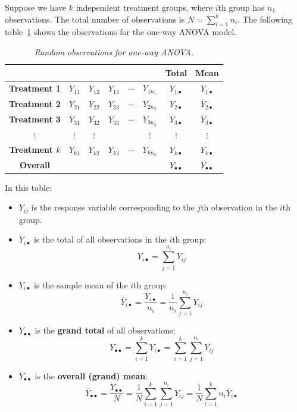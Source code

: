 \documentclass[twoside]{book}
\begin{document}
\vspace{1em}
\noindent Suppose we have $k$ independent treatment groups, where $i$th group has $n_1$ observations. The total number of observations is $N = \sum_{i=1}^k n_i$. The following table~\ref{tab:one-way-anova} shows the observations for the one-way ANOVA model.
\begin{table}[H]
\centering
\begin{tabular}{c|ccccc|c|c}
\toprule
 &  &  & & & & \textbf{Total} & \textbf{Mean} \\
\midrule
\textbf{Treatment 1} & $Y_{11}$ & $Y_{12}$ & $Y_{13}$ & $\cdots$ & $Y_{1n_1}$ & $Y_{1\bullet}$ & $\overline{Y}_{1\bullet}$ \\
\textbf{Treatment 2} & $Y_{21}$ & $Y_{22}$ & $Y_{23}$ &$\cdots$ & $Y_{2n_2}$ & $Y_{2\bullet}$ & $\overline{Y}_{2\bullet}$ \\
\textbf{Treatment 3} & $Y_{31}$ & $Y_{32}$ & $Y_{33}$ &$\cdots$ & $Y_{3n_2}$ & $Y_{3\bullet}$ & $\overline{Y}_{3\bullet}$ \\
$\vdots$             & $\vdots$ & $\vdots$ &    &     & $\vdots$ & $\vdots$        & $\vdots$        \\
\textbf{Treatment $k$}& $Y_{k1}$ & $Y_{k2}$ & $Y_{k3}$ &$\cdots$ & $Y_{kn_k}$ & $Y_{k\bullet}$ & $\overline{Y}_{k\bullet}$ \\
\midrule
\textbf{Overall} & & & & & & $Y_{\bullet\bullet}$ & $\overline{Y}_{\bullet\bullet}$\\
\bottomrule
\end{tabular}
\caption{\textit{Random observations for one-way ANOVA.}}
\label{tab:one-way-anova}
\end{table}



\noindent In this table:
\begin{itemize}[label=\(\circ\)]
    \item $Y_{ij}$ is the response variable corresponding to the $j$th observation in the $i$th group.
    \item $Y_{i\bullet}$ is the total of all observations in the $i$th group:
    $$Y_{i\bullet} = \sum_{j=1}^{n_i} Y_{ij}$$
    \item $\overline{Y}_{i\bullet}$ is the sample mean of the $i$th group:
    $$\overline{Y}_{i\bullet} = \dfrac{Y_{i\bullet}}{n_i} = \dfrac{1}{n_i}\sum_{j=1}^{n_i} Y_{ij}$$
    \item $Y_{\bullet\bullet}$ is the \textbf{grand total} of all observations:
    $$Y_{\bullet\bullet} =\sum_{i=1}^k Y_{i\bullet}= \sum_{i=1}^{k} \sum_{j=1}^{n_i} Y_{ij}$$
    \item $\overline{Y}_{\bullet\bullet}$ is the \textbf{overall (grand) mean}:
    $$\overline{Y}_{\bullet\bullet} = \dfrac{Y_{\bullet\bullet}}{N} = \dfrac{1}{N}\sum_{i=1}^{k} \sum_{j=1}^{n_i} Y_{ij} = \dfrac{1}{N}\sum_{i=1}^{k} n_i \overline Y_{i\bullet}$$
\end{itemize}
\end{document}
